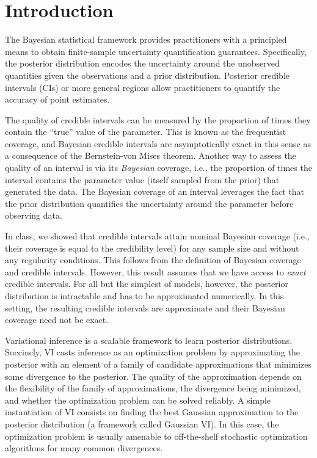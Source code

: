 \section{Introduction}

The Bayesian statistical framework provides practitioners with a principled
means to obtain finite-sample uncertainty quantification guarantees.
Specifically, the posterior distribution encodes the uncertainty
around the unobserved quantities given the observations and
a prior distribution.
Posterior credible intervals (CIs) or more general regions
allow practitioners to quantify the accuracy of point estimates.


The quality of credible intervals can be measured by
the proportion of times they contain the ``true''
value of the parameter.
This is known as the frequentist coverage,
and Bayesian credible intervals are asymptotically exact
in this sense as a consequence of the Bernstein-von Mises theorem.
Another way to assess the quality of an interval is via its
\emph{Bayesian} coverage, i.e.,
the proportion of times the interval contains the parameter
value (itself sampled from the prior) that generated the data.
The Bayesian coverage of an interval leverages the fact that the prior
distribution quantifies the uncertainty around the parameter
before observing data.

In class, we showed that credible intervals attain nominal Bayesian coverage
(i.e., their coverage is equal to the credibility level) for any sample size
and without any regularity conditions.
This follows from the definition of Bayesian coverage and credible intervals.
However, this result assumes that we have access to \emph{exact}
credible intervals.
For all but the simplest of models, however,
the posterior distribution is intractable and has to be approximated numerically.
In this setting,
the resulting credible intervals are approximate
and their Bayesian coverage need not be exact.

Variational inference \citep[VI][]{jordan1999vi,wainwright2008vi}
is a scalable framework to learn posterior distributions.
Succincly, VI casts inference as an optimization problem
by approximating the posterior with an element of
a family of candidate approximations that minimizes some divergence
to the posterior.
The quality of the approximation depends on
the flexibility of the family of approximations,
the divergence being minimized,
and whether the optimization problem can be solved reliably.
A simple instantiation of VI consists on finding the best
Gaussian approximation to the posterior distribution
(a framework called Gaussian VI).
In this case, the optimization problem is usually amenable
to off-the-shelf stochastic optimization algorithms
for many common divergences.

